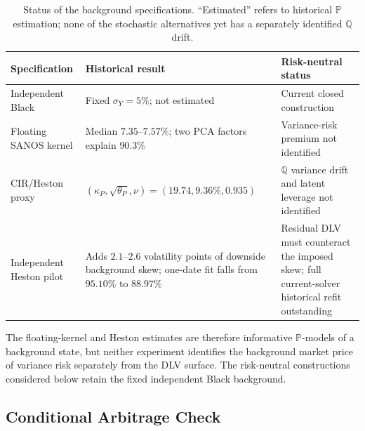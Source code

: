 \documentclass[11pt]{article}
\newcommand{\Q}{\mathbb Q}
\newcommand{\PP}{\mathbb P}
\theoremstyle{plain}
\theoremstyle{definition}
\theoremstyle{remark}
\begin{document}
\begin{table}[htbp]
  \centering
  \small
  \caption{Status of the background specifications.  ``Estimated'' refers to
  historical $\PP$ estimation; none of the stochastic alternatives yet has a
  separately identified $\Q$ drift.}
  \label{tab:background-process-estimates}
  \begin{tabular}{@{}p{}p{}p{}@{}}
    \toprule
    Specification & Historical result & Risk-neutral status \\
    \midrule
    Independent Black
      & Fixed $\sigma_Y=5\%$; not estimated
      & Current closed construction \\
    Floating SANOS kernel
      & Median $7.35$--$7.57\%$; two PCA factors explain $90.3\%$
      & Variance-risk premium not identified \\
    CIR/Heston proxy
      & $(\kappa_P,\sqrt{\theta_P},\nu)=(19.74,9.36\%,0.935)$
      & $\Q$ variance drift and latent leverage not identified \\
    Independent Heston pilot
      & Adds $2.1$--$2.6$ volatility points of downside background skew;
        one-date fit falls from $95.10\%$ to $88.97\%$
      & Residual DLV must counteract the imposed skew; full current-solver
        historical refit outstanding \\
    \bottomrule
  \end{tabular}
\end{table}

The floating-kernel and Heston estimates are therefore informative
$\PP$-models of a background state, but neither experiment identifies the
background market price of variance risk separately from the DLV surface.
The risk-neutral constructions considered below retain the fixed independent
Black background.

\subsection{Conditional Arbitrage Check}
\label{sec:conditional-arbitrage-check}
\end{document}
